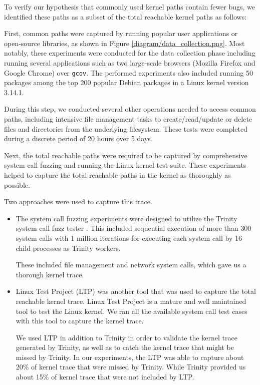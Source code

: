 To verify our hypothesis that commonly used kernel paths contain fewer bugs, 
we identified these paths as a subset of the total reachable kernel paths as follows:

First, common paths were captured by running popular user applications or open-source libraries, as shown in Figure \ref{diagram/data_collection.png}. Most notably, these experiments were conducted for the data collection phase including running several applications such as two large-scale browsers (Mozilla Firefox and Google Chrome) over \texttt{gcov}. The  performed experiments also included running 50 packages among the top 200 popular Debian packages \cite{Top-Packages} in a Linux kernel version 3.14.1.

During this step, we conducted several other operations needed to access common paths, including intensive file management tasks to create/read/update or delete files and directories from the underlying filesystem. These tests were completed during a discrete period of 20 hours over 5 days.

Next, the total reachable paths were required to be captured by comprehensive system call fuzzing and running the Linux kernel test suite. These experiments helped to capture the total reachable paths in the kernel as thoroughly as possible. 

Two approaches were used to capture this trace.

\begin{itemize}
\item The system call fuzzing experiments were designed to utilize the Trinity system call fuzz tester \cite{Trinity}. This included sequential execution of more than 300 system calls with 1 million iterations for executing each system call by 16 child processes as Trinity workers.

These included file management and network system calls,  which gave us a thorough kernel trace. 

\item Linux Test Project (LTP) \cite{LTP} was another tool that was used to capture the total reachable kernel trace.
Linux Test Project is a mature and well maintained tool to test the Linux
kernel. 
We ran all the available system call test cases with this tool to capture
the kernel trace. 

We used LTP in addition to Trinity in order to validate the kernel trace generated 
by Trinity, as well as to catch the kernel trace that might be missed by Trinity. 
In our experiments, the LTP was able to capture about 20\% of kernel trace 
that were missed by Trinity. While Trinity provided us about 15\% of kernel trace 
that were not included by LTP. 
\end{itemize}



